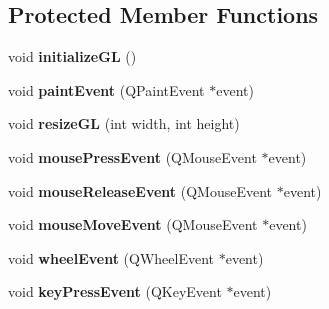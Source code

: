 \subsection*{Protected Member Functions}
\begin{DoxyCompactItemize}
\item 
\hypertarget{class_d_o_1_1_open_g_l_window_a2d3d45239c78255c23a70ca558b4d4f1}{void {\bfseries initialize\-G\-L} ()}\label{class_d_o_1_1_open_g_l_window_a2d3d45239c78255c23a70ca558b4d4f1}

\item 
\hypertarget{class_d_o_1_1_open_g_l_window_accfb24f32254fb98c049727597a53956}{void {\bfseries paint\-Event} (Q\-Paint\-Event $\ast$event)}\label{class_d_o_1_1_open_g_l_window_accfb24f32254fb98c049727597a53956}

\item 
\hypertarget{class_d_o_1_1_open_g_l_window_a3efe88f982dbec7825725dd954991139}{void {\bfseries resize\-G\-L} (int width, int height)}\label{class_d_o_1_1_open_g_l_window_a3efe88f982dbec7825725dd954991139}

\item 
\hypertarget{class_d_o_1_1_open_g_l_window_ad2272e344e46519f026cd02f419884f1}{void {\bfseries mouse\-Press\-Event} (Q\-Mouse\-Event $\ast$event)}\label{class_d_o_1_1_open_g_l_window_ad2272e344e46519f026cd02f419884f1}

\item 
\hypertarget{class_d_o_1_1_open_g_l_window_a35226f6549add1ff837c65888fcd00fc}{void {\bfseries mouse\-Release\-Event} (Q\-Mouse\-Event $\ast$event)}\label{class_d_o_1_1_open_g_l_window_a35226f6549add1ff837c65888fcd00fc}

\item 
\hypertarget{class_d_o_1_1_open_g_l_window_ae820c6a86f0a1908bf451f86db043489}{void {\bfseries mouse\-Move\-Event} (Q\-Mouse\-Event $\ast$event)}\label{class_d_o_1_1_open_g_l_window_ae820c6a86f0a1908bf451f86db043489}

\item 
\hypertarget{class_d_o_1_1_open_g_l_window_aca4aade13313c3deb599501abdd947f1}{void {\bfseries wheel\-Event} (Q\-Wheel\-Event $\ast$event)}\label{class_d_o_1_1_open_g_l_window_aca4aade13313c3deb599501abdd947f1}

\item 
\hypertarget{class_d_o_1_1_open_g_l_window_adf2e9d5e456a754a5459e8435b0b094b}{void {\bfseries key\-Press\-Event} (Q\-Key\-Event $\ast$event)}\label{class_d_o_1_1_open_g_l_window_adf2e9d5e456a754a5459e8435b0b094b}


\end{DoxyCompactItemize}
